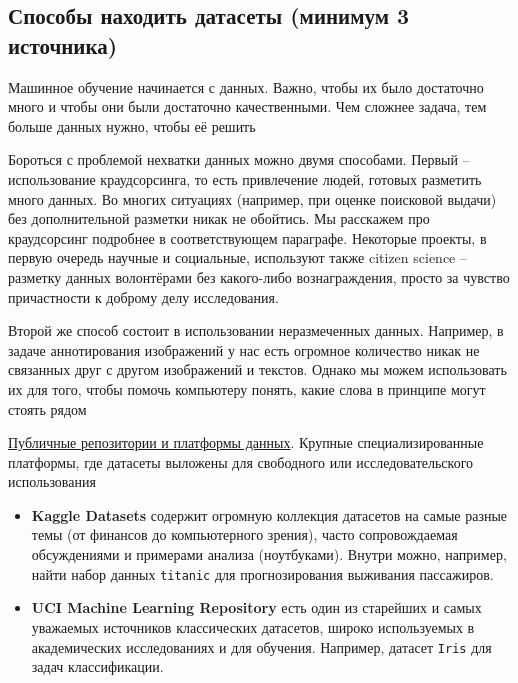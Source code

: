 \subsection{Способы находить датасеты (минимум 3 источника)}

Машинное обучение начинается с данных.
Важно, чтобы их было достаточно много и чтобы они были достаточно качественными.
Чем сложнее задача, тем больше данных нужно, чтобы её решить

Бороться с проблемой нехватки данных можно двумя способами.
Первый -- использование краудсорсинга, то есть привлечение людей, готовых разметить много данных.
Во многих ситуациях (например, при оценке поисковой выдачи) без дополнительной разметки никак не обойтись.
Мы расскажем про краудсорсинг подробнее в соответствующем параграфе.
Некоторые проекты, в первую очередь научные и социальные, используют также citizen science -- разметку данных
волонтёрами без какого-либо вознаграждения, просто за чувство причастности к доброму делу исследования.

Второй же способ состоит в использовании неразмеченных данных.
Например, в задаче аннотирования изображений у нас есть огромное количество никак не связанных друг с другом
изображений и текстов.
Однако мы можем использовать их для того, чтобы помочь компьютеру понять, какие слова в принципе могут стоять рядом

\vspace{5mm}
\underline{Публичные репозитории и платформы данных}.
Крупные специализированные платформы, где датасеты выложены для свободного или исследовательского использования
\begin{itemize}
    
    \item \textbf{Kaggle Datasets} содержит огромную коллекция датасетов на самые разные темы (от финансов до
    компьютерного зрения), часто сопровождаемая обсуждениями и примерами анализа (ноутбуками).
    Внутри можно, например, найти набор данных \texttt{titanic} для прогнозирования выживания пассажиров.
    
    \item \textbf{UCI Machine Learning Repository} есть один из старейших и самых уважаемых источников классических
    датасетов, широко используемых в академических исследованиях и для обучения.
    Например, датасет \texttt{Iris} для задач классификации.

\end{itemize}

